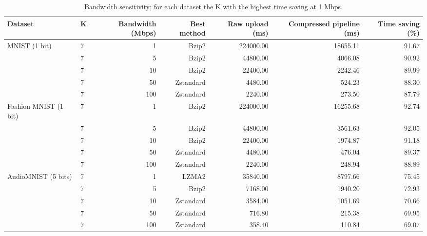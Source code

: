 \begin{table}[t]
\centering
\caption{Bandwidth sensitivity; for each dataset the K with the highest time saving at 1 Mbps.}
\footnotesize
\begin{tabular}{llrrrrr}
\toprule
Dataset & K & Bandwidth (Mbps) & Best method & Raw upload (ms) & Compressed pipeline (ms) & Time saving (\%) \\
\midrule
MNIST (1 bit) & 7 & 1 & Bzip2 & 224000.00 & 18655.11 & 91.67 \\
 & 7 & 5 & Bzip2 & 44800.00 & 4066.08 & 90.92 \\
 & 7 & 10 & Bzip2 & 22400.00 & 2242.46 & 89.99 \\
 & 7 & 50 & Zstandard & 4480.00 & 524.23 & 88.30 \\
 & 7 & 100 & Zstandard & 2240.00 & 273.50 & 87.79 \\
Fashion-MNIST (1 bit) & 7 & 1 & Bzip2 & 224000.00 & 16255.68 & 92.74 \\
 & 7 & 5 & Bzip2 & 44800.00 & 3561.63 & 92.05 \\
 & 7 & 10 & Bzip2 & 22400.00 & 1974.87 & 91.18 \\
 & 7 & 50 & Zstandard & 4480.00 & 476.04 & 89.37 \\
 & 7 & 100 & Zstandard & 2240.00 & 248.94 & 88.89 \\
AudioMNIST (5 bits) & 7 & 1 & LZMA2 & 35840.00 & 8797.66 & 75.45 \\
 & 7 & 5 & Bzip2 & 7168.00 & 1940.20 & 72.93 \\
 & 7 & 10 & Zstandard & 3584.00 & 1051.69 & 70.66 \\
 & 7 & 50 & Zstandard & 716.80 & 215.38 & 69.95 \\
 & 7 & 100 & Zstandard & 358.40 & 110.84 & 69.07 \\
\bottomrule
\end{tabular}
\end{table}
